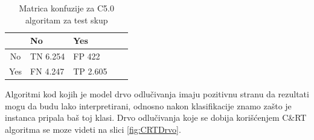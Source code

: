 \documentclass[a4paper]{article}
\begin{document}
\begin{table}[h!]
\begin{center}
\caption{Matrica konfuzije za C5.0 algoritam za test skup}
\begin{tabular}{|c|l|l|l|l|} \hline
& No& Yes \\ \hline
No &TN 6.254 &FP 422 \\ \hline
Yes &FN 4.247 &TP 2.605  \\ \hline
\end{tabular}
\label{tab:tabelaCRTKonfuzije}
\end{center}
\end{table}

Algoritmi kod kojih je model drvo odlučivanja imaju pozitivnu stranu da rezultati mogu da budu lako interpretirani, odnosno nakon klasifikacije znamo zašto je instanca pripala baš toj klasi. Drvo odlučivanja koje se dobija korišćenjem C\&RT algoritma se moze videti na slici \ref{fig:CRTDrvo}.
\end{document}
